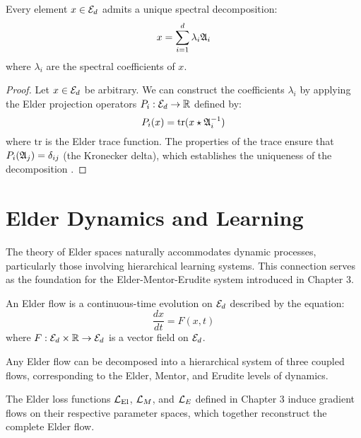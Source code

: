 \begin{theorem}
Every element $x \in \mathcal{E}_{d}$ admits a unique spectral decomposition:
\begin{equation}
x = \sum_{i=1}^{d} \lambda_i \mathfrak{A}_{i}
\end{equation}
where $\lambda_i$ are the spectral coefficients of $x$.
\end{theorem}

\begin{proof}
Let $x \in \mathcal{E}_{d}$ be arbitrary. We can construct the coefficients $\lambda_i$ by applying the Elder projection operators $P_i : \mathcal{E}_{d} \to \mathbb{R}$ defined by:
\begin{equation}
P_i(x) = \text{tr}(x \star \mathfrak{A}_{i}^{-1})
\end{equation}
where $\text{tr}$ is the Elder trace function. The properties of the trace ensure that $P_i(\mathfrak{A}_{j}) = \delta_{ij}$ (the Kronecker delta), which establishes the uniqueness of the decomposition \cite{elder_mentor_erudite}.
\end{proof}

\section{Elder Dynamics and Learning}

The theory of Elder spaces naturally accommodates dynamic processes, particularly those involving hierarchical learning systems. This connection serves as the foundation for the Elder-Mentor-Erudite system introduced in Chapter 3.

\begin{definition}
An Elder flow is a continuous-time evolution on $\mathcal{E}_{d}$ described by the equation:
\begin{equation}
\frac{dx}{dt} = F(x, t)
\end{equation}
where $F: \mathcal{E}_{d} \times \mathbb{R} \rightarrow \mathcal{E}_{d}$ is a vector field on $\mathcal{E}_{d}$.
\end{definition}

\begin{theorem}
Any Elder flow can be decomposed into a hierarchical system of three coupled flows, corresponding to the Elder, Mentor, and Erudite levels of dynamics.
\end{theorem}

\begin{corollary}
The Elder loss functions $\mathcal{L}_{\text{El}}$, $\mathcal{L}_M$, and $\mathcal{L}_E$ defined in Chapter 3 induce gradient flows on their respective parameter spaces, which together reconstruct the complete Elder flow.
\end{corollary}

